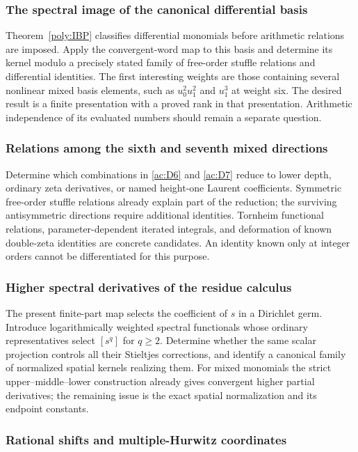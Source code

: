\subsubsection{The spectral image of the canonical differential basis}

Theorem~\ref{poly:IBP} classifies differential monomials before arithmetic
relations are imposed. Apply the convergent-word map to this basis and
determine its kernel modulo a precisely stated family of free-order
stuffle relations and differential identities. The first interesting
weights are those containing several nonlinear mixed basis elements,
such as $u_0^2u_1^2$ and $u_1^3$ at weight six. The desired result is a
finite presentation with a proved rank in that presentation. Arithmetic
independence of its evaluated numbers should remain a separate question.

\subsubsection{Relations among the sixth and seventh mixed directions}

Determine which combinations in \eqref{ac:D6} and \eqref{ac:D7}
reduce to lower depth, ordinary zeta derivatives, or named
height-one Laurent coefficients. Symmetric free-order stuffle relations
already explain part of the reduction; the surviving antisymmetric
directions require additional identities. Tornheim functional relations,
parameter-dependent iterated integrals, and deformation of known
double-zeta identities are concrete candidates. An identity known only
at integer orders cannot be differentiated for this purpose.

\subsubsection{Higher spectral derivatives of the residue calculus}

The present finite-part map selects the coefficient of $s$ in a
Dirichlet germ. Introduce logarithmically weighted spectral functionals
whose ordinary representatives select $[s^q]$ for $q\ge2$.
Determine whether the same scalar projection controls all their
Stieltjes corrections, and identify a canonical family of normalized
spatial kernels realizing them. For mixed monomials the strict
upper--middle--lower construction already gives convergent higher
partial derivatives; the remaining issue is the exact spatial
normalization and its endpoint constants.

\subsubsection{Rational shifts and multiple-Hurwitz coordinates}

